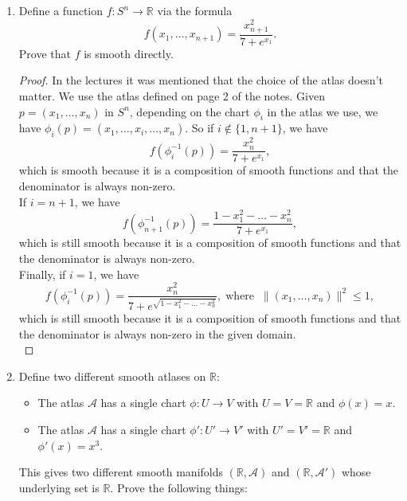 \documentclass{article}
\begin{document}
\begin{enumerate}[label={\bf Q\arabic*:}]
  \item Define a function $f:S^n\rightarrow\mathbb{R}$ via the formula
    \begin{equation*}
      f(x_1,\ldots,x_{n+1}) = \frac{x_{n+1}^2}{7+e^{x_1}}.
    \end{equation*}
    Prove that $f$ is smooth directly.

    \begin{proof}
      In the lectures it was mentioned that the choice of the atlas doesn't
      matter. We use the atlas defined on page 2 of the notes. Given
      $p=(x_1,\ldots,x_n)$ in $S^n$, depending on the chart $\phi_i$ in the
      atlas we use, we have $\phi_i(p)=(x_1,\ldots,\hat{x_i},\ldots,x_n)$.
      So if $i\not\in\{1,n+1\}$, we have
      \begin{equation*}
        f(\phi_i^{-1}(p)) = \frac{x_{n}^2}{7+e^{x_1}},
      \end{equation*}
      which is smooth because it is a composition of smooth functions and
      that the denominator is always non-zero. \\

      If $i=n+1$, we have
      \begin{equation*}
        f(\phi_{n+1}^{-1}(p)) = \frac{1-x_1^2-\ldots-x_n^2}{7+e^{x_1}},
      \end{equation*}
      which is still smooth because it is a composition of smooth functions
      and that the denominator is always non-zero. \\

      Finally, if $i=1$, we have
      \begin{equation*}
        f(\phi_i^{-1}(p)) =
        \frac{x_{n}^2}{7+e^{\sqrt{1-x_1^2-\ldots-x_n^2}}},\;
        \text{where}\;\; \|(x_1,\ldots,x_n)\|^2\leq1,
      \end{equation*}
      which is still smooth because it is a composition of smooth functions
      and that the denominator is always non-zero in the given domain. \\
    \end{proof}

  \item Define two different smooth atlases on $\mathbb{R}$:
    \begin{itemize}
      \item The atlas $\mathcal{A}$ has a single chart $\phi:U\rightarrow
        V$ with $U=V=\mathbb{R}$ and $\phi(x)=x$.
      \item The atlas $\mathcal{A}$ has a single chart
        $\phi':U'\rightarrow V'$ with $U'=V'=\mathbb{R}$ and
        $\phi'(x)=x^3$.
    \end{itemize}
    This gives two different smooth manifolds $(\mathbb{R},\mathcal{A})$
    and $(\mathbb{R},\mathcal{A}')$ whose underlying set is $\mathbb{R}$.
    Prove the following things:


\end{enumerate}
\end{document}
